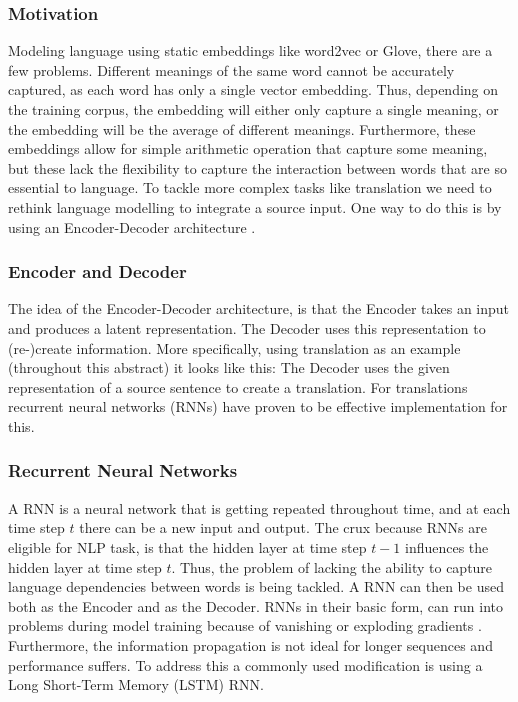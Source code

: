 \documentclass[11pt, a4paper]{amsart}
\begin{document}
\subsubsection{Motivation}

Modeling language using static embeddings like word2vec or Glove, there are a few problems. Different meanings of the same word cannot be accurately captured, as each word has only a single vector embedding. Thus, depending on the training corpus, the embedding will either only capture a single meaning, or the embedding will be the average of different meanings. Furthermore, these embeddings allow for simple arithmetic operation that capture some meaning, but these lack the flexibility to capture the interaction between words that are so essential to language. To tackle more complex tasks like translation we need to rethink language modelling to integrate a source input. One way to do this is by using an Encoder-Decoder architecture \cite{voitseq2seq}. 

\subsubsection{Encoder and Decoder}
The idea of the Encoder-Decoder architecture, is that the Encoder takes an input and produces a latent representation. The Decoder uses this representation to (re-)create information. More specifically, using translation as an example (throughout this abstract) it looks like this: The Decoder uses the given representation of a source sentence to create a translation. For translations recurrent neural networks (RNNs) have proven to be effective implementation for this.

\subsubsection{Recurrent Neural Networks}
A RNN is a neural network that is getting repeated throughout time, and at each time step $t$ there can be a new input and output. The crux because RNNs are eligible for NLP task, is that the hidden layer at time step $t-1$ influences the hidden layer at time step $t$. Thus, the problem of lacking the ability to capture language dependencies between words is being tackled. A RNN can then be used both as the Encoder and as the Decoder. RNNs in their basic form, can run into problems during model training because of vanishing or exploding gradients  \cite{sutskever2014sequence}. Furthermore, the information propagation is not ideal for longer sequences and performance suffers. To address this a commonly used modification is using a Long Short-Term Memory (LSTM) RNN. 
\end{document}
